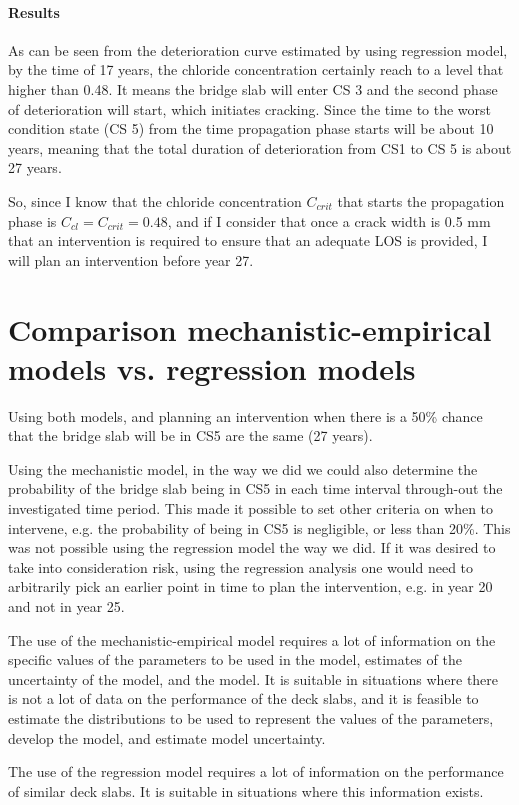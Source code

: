 \paragraph{Results}
As can be seen from the deterioration curve estimated by using regression model, by the time of 17 years, the chloride concentration certainly reach to a level that higher than 0.48. It means the bridge slab will enter CS 3 and the second phase of deterioration will start, which initiates cracking. Since the time to the worst condition state (CS 5) from the time propagation phase starts will be about 10 years, meaning that the total duration of deterioration from CS1 to CS 5 is about 27 years.

So, since I know that the chloride concentration ${C_{crit}}$ that starts the propagation phase is ${C_{cl}} = {C_{crit}} = 0.48$, and if I consider that once a crack width is 0.5 mm that an intervention is required to ensure that an adequate LOS is provided, I will plan an intervention before year 27. 
\section{Comparison mechanistic-empirical models vs. regression models}
Using both models, and planning an intervention when there is a 50\% chance that the bridge slab will be in CS5 are the same (27 years). 

Using the mechanistic model, in the way we did we could also determine the probability of the bridge slab being in CS5 in each time interval through-out the investigated time period. This made it possible to set other criteria on when to intervene, e.g. the probability of being in CS5 is negligible, or less than 20\%. This was not possible using the regression model the way we did. If it was desired to take into consideration risk, using the regression analysis one would need to arbitrarily pick an earlier point in time to plan the intervention, e.g. in year 20 and not in year 25. 

The use of the mechanistic-empirical model requires a lot of information on the specific values of the parameters to be used in the model, estimates of the uncertainty of the model, and the model. It is suitable in situations where there is not a lot of data on the performance of the deck slabs, and it is feasible to estimate the distributions to be used to represent the values of the parameters, develop the model, and estimate model uncertainty.

The use of the regression model requires a lot of information on the performance of similar deck slabs. It is suitable in situations where this information exists.
